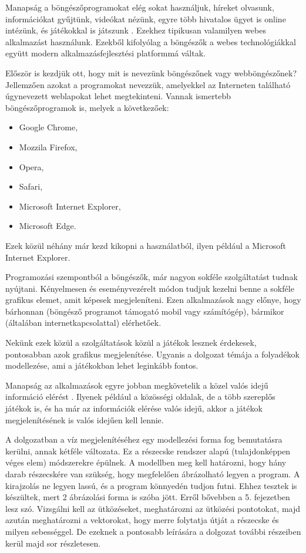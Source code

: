 

Manapság a böngészőprogramokat elég sokat használjuk, híreket olvasunk, információkat gyűjtünk, videókat nézünk, egyre több hivatalos ügyet is online intézünk, és játékokkal is játszunk \cite{alk}. Ezekhez tipikusan valamilyen webes alkalmazást használunk. Ezekből kifolyólag a böngészők a webes technológiákkal együtt modern alkalmazásfejlesztési platformmá váltak.

Először is kezdjük ott, hogy mit is nevezünk böngészőnek vagy webböngészőnek? Jellemzően azokat a programokat nevezzük, amelyekkel az Interneten található úgynevezett weblapokat lehet megtekinteni.
Vannak ismertebb böngészőprogramok is, melyek a következőek:
\begin{itemize}
	\item Google Chrome,
	\item Mozzila Firefox,
	\item Opera,
	\item Safari,
	\item Microsoft Internet Explorer,
	\item Microsoft Edge.
\end{itemize}
Ezek közül néhány már kezd kikopni a használatból, ilyen például a Microsoft Internet Explorer.

Programozási szempontból a böngészők, már nagyon sokféle szolgáltatást tudnak nyújtani. Kényelmesen és eseményvezérelt módon tudjuk kezelni benne a sokféle grafikus elemet, amit képesek megjeleníteni. Ezen alkalmazások nagy előnye, hogy bárhonnan (böngésző programot támogató mobil vagy számítógép), bármikor (általában internetkapcsolattal) elérhetőek. 

Nekünk ezek közül a szolgáltatások közül a játékok lesznek érdekesek, pontosabban azok grafikus megjelenítése. Ugyanis a dolgozat témája a folyadékok modellezése, ami a játékokban lehet leginkább fontos.

Manapság az alkalmazások egyre jobban megkövetelik a közel valós idejű információ elérést \cite{valos}. Ilyenek például a közösségi oldalak, de a több szereplős játékok is, és ha már az információk elérése valós idejű, akkor a játékok megjelenítésének is valós idejűen kell lennie.

A dolgozatban a víz megjelenítéséhez egy modellezési forma fog bemutatásra kerülni, annak kétféle változata. Ez a részecske rendszer alapú (tulajdonképpen véges elem) módszerekre épülnek.
A modellben meg kell határozni, hogy hány darab részecskére van szükség, hogy megfelelően ábrázolható legyen a program. A kirajzolás ne legyen lassú, és a program könnyedén tudjon futni. Ehhez tesztek is készültek, mert 2 ábrázolási forma is szóba jött. Erről bővebben a 5. fejezetben lesz szó. Vizsgálni kell az ütközéseket, meghatározni az ütközési pontotokat, majd azután meghatározni a vektorokat, hogy merre folytatja útját a részecske és milyen sebességgel. De ezeknek a pontosabb leírására a dolgozat további részeiben kerül majd sor részletesen. 

